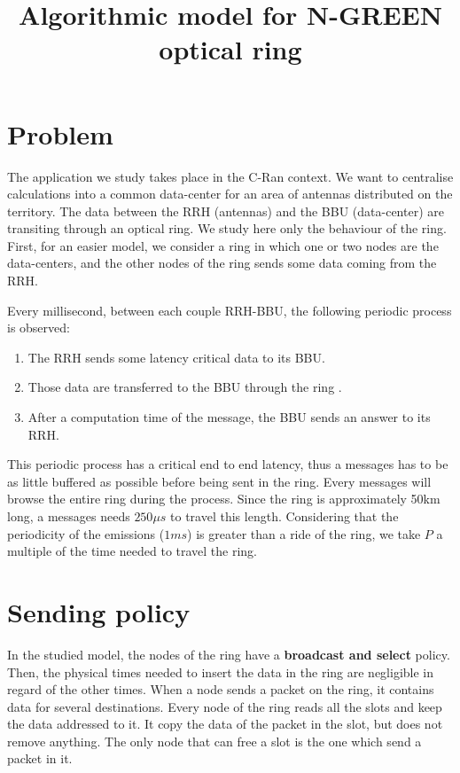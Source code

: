 \documentclass[a4paper,10pt]{article}
\title{Algorithmic model for N-GREEN optical ring}
\begin{document}
\maketitle
\section*{Problem}
The application we study takes place in the C-Ran context. We want to centralise calculations into a common data-center for an area of antennas distributed on the territory. The data between the RRH (antennas) and the BBU (data-center) are transiting through an optical ring. We study here only the behaviour of the ring. First, for an easier model, we consider a ring in which one or two nodes are the data-centers, and the other nodes of the ring sends some data coming from the RRH.

Every millisecond, between each couple RRH-BBU, the following periodic process is observed:
\begin{enumerate}
 \item The RRH sends some latency critical data to its BBU.
 \item Those data are transferred to the BBU through the ring .
 \item After a computation time of the message, the BBU sends an answer to its RRH.
\end{enumerate}
 This periodic process has a critical end to end latency, thus a messages has to be as little buffered as possible before being sent in the ring.
 Every messages will browse the entire ring during the process. Since the ring is approximately 50km long, a messages needs $250 \mu s$ to travel this length.
 Considering that the periodicity of the emissions ($1ms$) is greater than a ride of the ring, we take $P$ a multiple of the time needed to travel the ring.
 
 
 
\section*{Sending policy}
In the studied model, the nodes of the ring have a {\bf broadcast and select} policy. Then, the physical times needed to insert the data in the ring are negligible in regard of the other times.
When a node sends a packet on the ring, it contains data for several destinations. Every node of the ring reads all the slots and keep the data addressed to it. It copy the data of the packet in the slot, but does not remove anything. The only node that can free a slot is the one which send a packet in it.
\end{document}
